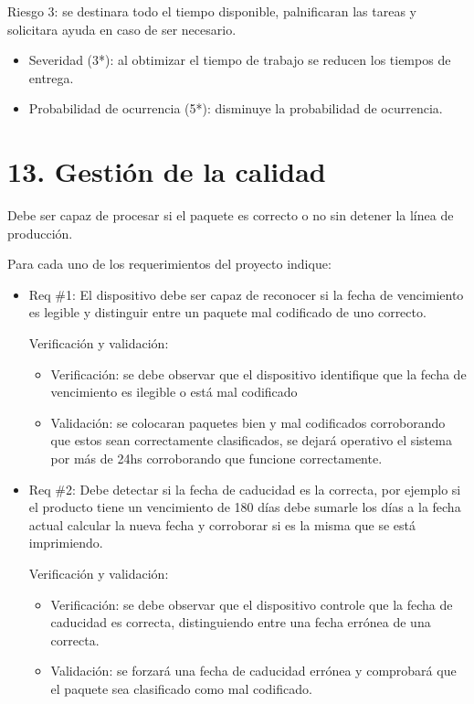 \documentclass[11pt]{charter}
\begin{document}
Riesgo 3: se destinara todo el tiempo disponible, palnificaran las tareas y solicitara ayuda en caso de ser necesario.

\begin{itemize}
\item Severidad (3*): al obtimizar el tiempo de trabajo se reducen los tiempos de entrega.
\item Probabilidad de ocurrencia (5*): disminuye la probabilidad de ocurrencia.
\end{itemize}

\newpage
\section{13. Gestión de la calidad}
\label{sec:calidad}




Debe ser capaz de procesar si el paquete es correcto o no sin detener la línea de producción.


Para cada uno de los requerimientos del proyecto indique:
\begin{itemize} 
\item Req \#1: El dispositivo debe ser capaz de reconocer si la fecha de vencimiento es legible y distinguir entre un paquete mal codificado de uno correcto.

Verificación y validación:

\begin{itemize}
\item Verificación: se debe observar que el dispositivo identifique que la fecha de vencimiento es ilegible o está mal codificado 
\item Validación: se colocaran paquetes bien y mal codificados corroborando que estos sean correctamente clasificados, se dejará operativo el sistema por más de 24hs corroborando que funcione correctamente.

\end{itemize}

\end{itemize}

\begin{itemize} 
\item Req \#2: Debe detectar si la fecha de caducidad es la correcta, por ejemplo si el producto tiene un vencimiento de 180 días debe sumarle los días a la fecha actual calcular la nueva fecha y corroborar si es la misma que se está imprimiendo. 

Verificación y validación:

\begin{itemize}
\item Verificación: se debe observar que el dispositivo controle que la fecha de caducidad es correcta, distinguiendo entre una fecha errónea de una correcta.
\item Validación: se forzará una fecha de caducidad errónea y comprobará que el paquete sea clasificado como mal codificado.

\end{itemize}

\end{itemize}
\end{document}
